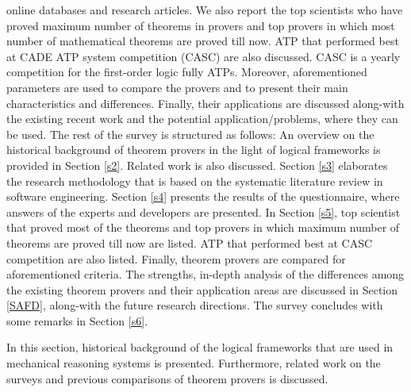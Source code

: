 online databases and research articles. 
We also report the top scientists who have proved maximum number of theorems in provers 
and top provers in which most number of mathematical theorems are proved till now. ATP that performed best at CADE ATP 
system competition (CASC) are also discussed. CASC is a yearly competition for the first-order logic fully ATPs. Moreover, aforementioned 
parameters are used to compare the provers and to present their main characteristics and differences. Finally, their applications 
are discussed along-with the existing recent work and the potential application/problems, where they can be used. 
The rest of the survey is structured as follows: An overview on the historical background of theorem provers in
the light of logical frameworks  is provided in Section \ref{s2}. Related work is also discussed. Section \ref{s3} elaborates the research 
methodology that is based on 
the systematic literature review in software engineering. Section \ref{s4} presents the results of the questionnaire, where answers of 
the experts and developers are presented. In Section \ref{s5}, top scientist that proved most of the theorems and top provers in which 
maximum number of theorems are proved till now are listed. ATP that performed best at CASC competition are also listed. Finally, theorem 
provers are compared for aforementioned criteria. The strengths, in-depth analysis of the differences among 
the existing theorem provers and their application areas are discussed in Section \ref{SAFD}, along-with the future research directions. 
The survey concludes with some remarks in Section \ref{s6}.

\label{s2}
In this section, historical background of the logical frameworks that are used in mechanical reasoning systems is presented. Furthermore, 
related work on the surveys and previous comparisons of theorem provers is discussed.

